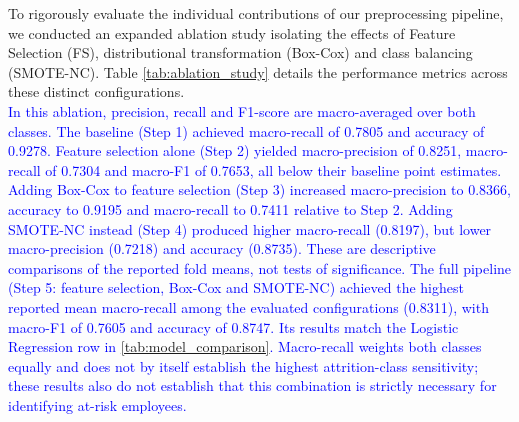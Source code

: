 \documentclass[a4paper,fleqn]{cas-sc}
\begin{document}

To rigorously evaluate the individual contributions of our preprocessing pipeline, we conducted an expanded ablation study isolating the effects of Feature Selection (FS), distributional transformation (Box-Cox) and class balancing (SMOTE-NC). Table \ref{tab:ablation_study} details the performance metrics across these distinct configurations.\\
\textcolor{blue}{In this ablation, precision, recall and F1-score are macro-averaged over both classes. The baseline (Step 1) achieved macro-recall of 0.7805 and accuracy of 0.9278. Feature selection alone (Step 2) yielded macro-precision of 0.8251, macro-recall of 0.7304 and macro-F1 of 0.7653, all below their baseline point estimates.}
\textcolor{blue}{Adding Box-Cox to feature selection (Step 3) increased macro-precision to 0.8366, accuracy to 0.9195 and macro-recall to 0.7411 relative to Step 2. Adding SMOTE-NC instead (Step 4) produced higher macro-recall (0.8197), but lower macro-precision (0.7218) and accuracy (0.8735). These are descriptive comparisons of the reported fold means, not tests of significance.}
\textcolor{blue}{The full pipeline (Step 5: feature selection, Box-Cox and SMOTE-NC) achieved the highest reported mean macro-recall among the evaluated configurations (0.8311), with macro-F1 of 0.7605 and accuracy of 0.8747. Its results match the Logistic Regression row in \cref{tab:model_comparison}. Macro-recall weights both classes equally and does not by itself establish the highest attrition-class sensitivity; these results also do not establish that this combination is strictly necessary for identifying at-risk employees.}
\end{document}
